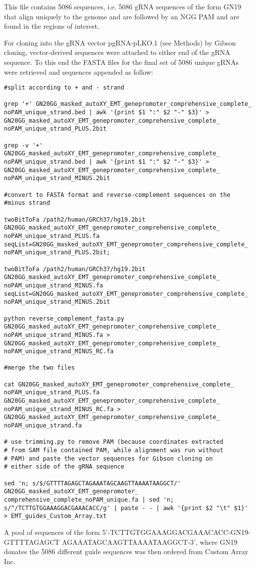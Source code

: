 This file contains 5086 sequences, i.e. 5086 gRNA sequences of the form GN19 that align uniquely to the genome and are followed by an NGG PAM and are found in the regions of interest.

For cloning into the gRNA vector pgRNA-pLKO.1 (see Methods) by Gibson cloning, vector-derived sequences were attached to either end of the gRNA sequence. To this end the FASTA files for the final set of 5086 unique gRNAs were retrieved and sequences appended as follow:

\begin{small}\begin{lstlisting}
#split according to + and - strand 

grep '+' GN20GG_masked_autoXY_EMT_genepromoter_comprehensive_complete_ noPAM_unique_strand.bed | awk '{print $1 ":" $2 "-" $3}' > GN20GG_masked_autoXY_EMT_genepromoter_comprehensive_complete_ noPAM_unique_strand_PLUS.2bit

grep -v '+' GN20GG_masked_autoXY_EMT_genepromoter_comprehensive_complete_ noPAM_unique_strand.bed | awk '{print $1 ":" $2 "-" $3}' > GN20GG_masked_autoXY_EMT_genepromoter_comprehensive_complete_ noPAM_unique_strand_MINUS.2bit

#convert to FASTA format and reverse-complement sequences on the 
#minus strand

twoBitToFa /path2/human/GRCh37/hg19.2bit GN20GG_masked_autoXY_EMT_genepromoter_comprehensive_complete_ noPAM_unique_strand_PLUS.fa seqList=GN20GG_masked_autoXY_EMT_genepromoter_comprehensive_complete_ noPAM_unique_strand_PLUS.2bit;

twoBitToFa /path2/human/GRCh37/hg19.2bit GN20GG_masked_autoXY_EMT_genepromoter_comprehensive_complete_ noPAM_unique_strand_MINUS.fa seqList=GN20GG_masked_autoXY_EMT_genepromoter_comprehensive_complete_ noPAM_unique_strand_MINUS.2bit

python reverse_complement_fasta.py GN20GG_masked_autoXY_EMT_genepromoter_comprehensive_complete_ noPAM_unique_strand_MINUS.fa > GN20GG_masked_autoXY_EMT_genepromoter_comprehensive_complete_ noPAM_unique_strand_MINUS_RC.fa

#merge the two files

cat GN20GG_masked_autoXY_EMT_genepromoter_comprehensive_complete_
noPAM_unique_strand_PLUS.fa GN20GG_masked_autoXY_EMT_genepromoter_comprehensive_complete_
noPAM_unique_strand_MINUS_RC.fa > GN20GG_masked_autoXY_EMT_genepromoter_comprehensive_complete_
noPAM_unique_strand.fa

# use trimming.py to remove PAM (because coordinates extracted 
# from SAM file contained PAM, while alignment was run without 
# PAM) and paste the vector sequences for Gibson cloning on 
# either side of the gRNA sequence

sed 'n; s/$/GTTTTAGAGCTAGAAATAGCAAGTTAAAATAAGGCT/' GN20GG_masked_autoXY_EMT_genepromoter_ comprehensive_complete_noPAM_unique.fa | sed 'n; s/^/TCTTGTGGAAAGGACGAAACACC/g' | paste - - | awk '{print $2 "\t" $1}' > EMT_guides_Custom_Array.txt
\end{lstlisting}\end{small}

A pool of sequences of the form 5'-TCTTGTGGAAAGGACGAAACACC-GN19-GTTTTAGAGCT AGAAATAGCAAGTTAAAATAAGGCT-3', where GN19 donates the 5086 different guide sequences was then ordered from Custom Array Inc. 

